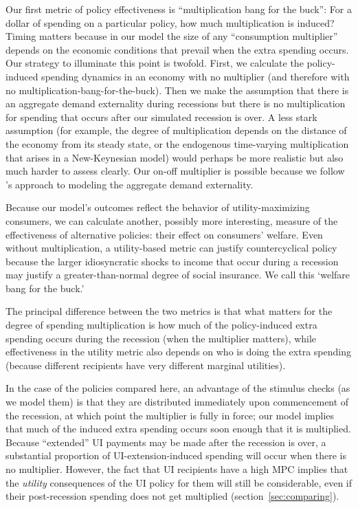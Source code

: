 \documentclass[\econtexRoot/HAFiscal]{subfiles}
\begin{document}
Our first metric of policy effectiveness is ``multiplication bang for the buck'': For a dollar of spending on a particular policy, how much multiplication is induced?  Timing matters because in our model the size of any ``consumption multiplier'' depends on the economic conditions that prevail when the extra spending occurs.  Our strategy to illuminate this point is twofold.  First, we calculate the policy-induced spending dynamics in an economy with no multiplier (and therefore with no multiplication-bang-for-the-buck).  Then we make the assumption that there is an aggregate demand externality during recessions but there is no multiplication for spending that occurs after our simulated recession is over.  A less stark assumption (for example, the degree of multiplication depends on the distance of the economy from its steady state, or the endogenous time-varying multiplication that arises in a New-Keynesian model) would perhaps be more realistic but also much harder to assess clearly.  Our on-off multiplier is possible because we follow \cite{kmpHandbook2016}'s approach to modeling the aggregate demand externality.  %

Because our model's outcomes reflect the behavior of utility-maximizing consumers, we can calculate another, possibly more interesting, measure of the effectiveness of alternative policies:  their effect on consumers' welfare.  Even without multiplication, a utility-based metric can justify countercyclical policy because the larger idiosyncratic shocks to income that occur during a recession may justify a greater-than-normal degree of social insurance.  We call this `welfare bang for the buck.'

The principal difference between the two metrics is that what matters for the degree of spending multiplication is how much of the policy-induced extra spending occurs during the recession (when the multiplier matters), while effectiveness in the utility metric also depends on who is doing the extra spending (because different recipients have very different marginal utilities).

In the case of the policies compared here, an advantage of the stimulus checks (as we model them) is that they are distributed immediately upon commencement of the recession, at which point the multiplier is fully in force; our model implies that much of the induced extra spending occurs soon enough that it is multiplied.  Because ``extended'' UI payments may be made after the recession is over, a substantial proportion of UI-extension-induced spending will occur when there is no multiplier.  However, the fact that UI recipients have a high MPC implies that the \textit{utility} consequences of the UI policy for them will still be considerable, even if their post-recession spending does not get multiplied (section~\ref{sec:comparing}).
\end{document}
